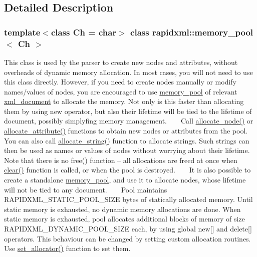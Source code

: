 \subsection{Detailed Description}
\subsubsection*{template$<$class Ch = char$>$\newline
class rapidxml\+::memory\+\_\+pool$<$ Ch $>$}

This class is used by the parser to create new nodes and attributes, without overheads of dynamic memory allocation. In most cases, you will not need to use this class directly. However, if you need to create nodes manually or modify names/values of nodes, you are encouraged to use \hyperlink{classrapidxml_1_1memory__pool}{memory\+\_\+pool} of relevant \hyperlink{classrapidxml_1_1xml__document}{xml\+\_\+document} to allocate the memory. Not only is this faster than allocating them by using {\ttfamily new} operator, but also their lifetime will be tied to the lifetime of document, possibly simplyfing memory management. ~\newline
~\newline
 Call \hyperlink{classrapidxml_1_1memory__pool_a4118581c29ee9a2f6b55ebf7dac185f8}{allocate\+\_\+node()} or \hyperlink{classrapidxml_1_1memory__pool_a3de2a66c983336e006ea3844e244ed30}{allocate\+\_\+attribute()} functions to obtain new nodes or attributes from the pool. You can also call \hyperlink{classrapidxml_1_1memory__pool_a171941b39d55b868358da97462185f58}{allocate\+\_\+string()} function to allocate strings. Such strings can then be used as names or values of nodes without worrying about their lifetime. Note that there is no {\ttfamily free()} function -- all allocations are freed at once when \hyperlink{classrapidxml_1_1memory__pool_aad377c835fdaed1cb2cc9df194cf84e4}{clear()} function is called, or when the pool is destroyed. ~\newline
~\newline
 It is also possible to create a standalone \hyperlink{classrapidxml_1_1memory__pool}{memory\+\_\+pool}, and use it to allocate nodes, whose lifetime will not be tied to any document. ~\newline
~\newline
 Pool maintains {\ttfamily R\+A\+P\+I\+D\+X\+M\+L\+\_\+\+S\+T\+A\+T\+I\+C\+\_\+\+P\+O\+O\+L\+\_\+\+S\+I\+ZE} bytes of statically allocated memory. Until static memory is exhausted, no dynamic memory allocations are done. When static memory is exhausted, pool allocates additional blocks of memory of size {\ttfamily R\+A\+P\+I\+D\+X\+M\+L\+\_\+\+D\+Y\+N\+A\+M\+I\+C\+\_\+\+P\+O\+O\+L\+\_\+\+S\+I\+ZE} each, by using global {\ttfamily new\mbox{[}\mbox{]}} and {\ttfamily delete\mbox{[}\mbox{]}} operators. This behaviour can be changed by setting custom allocation routines. Use \hyperlink{classrapidxml_1_1memory__pool_a84d3d8d2cdfc00501e1dcf26d889ae03}{set\+\_\+allocator()} function to set them. ~\newline
